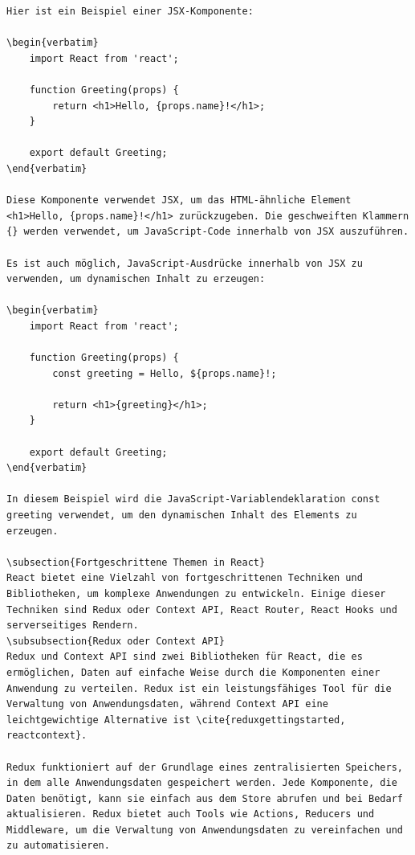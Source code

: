 \begin{lstlisting}
Hier ist ein Beispiel einer JSX-Komponente:

\begin{verbatim}
	import React from 'react';
	
	function Greeting(props) {
		return <h1>Hello, {props.name}!</h1>;
	}
	
	export default Greeting;
\end{verbatim}

Diese Komponente verwendet JSX, um das HTML-ähnliche Element <h1>Hello, {props.name}!</h1> zurückzugeben. Die geschweiften Klammern {} werden verwendet, um JavaScript-Code innerhalb von JSX auszuführen.

Es ist auch möglich, JavaScript-Ausdrücke innerhalb von JSX zu verwenden, um dynamischen Inhalt zu erzeugen:

\begin{verbatim}
	import React from 'react';
	
	function Greeting(props) {
		const greeting = Hello, ${props.name}!;
		
		return <h1>{greeting}</h1>;
	}
	
	export default Greeting;
\end{verbatim}

In diesem Beispiel wird die JavaScript-Variablendeklaration const greeting verwendet, um den dynamischen Inhalt des Elements zu erzeugen.

\subsection{Fortgeschrittene Themen in React}
React bietet eine Vielzahl von fortgeschrittenen Techniken und Bibliotheken, um komplexe Anwendungen zu entwickeln. Einige dieser Techniken sind Redux oder Context API, React Router, React Hooks und serverseitiges Rendern.
\subsubsection{Redux oder Context API}
Redux und Context API sind zwei Bibliotheken für React, die es ermöglichen, Daten auf einfache Weise durch die Komponenten einer Anwendung zu verteilen. Redux ist ein leistungsfähiges Tool für die Verwaltung von Anwendungsdaten, während Context API eine leichtgewichtige Alternative ist \cite{reduxgettingstarted, reactcontext}.

Redux funktioniert auf der Grundlage eines zentralisierten Speichers, in dem alle Anwendungsdaten gespeichert werden. Jede Komponente, die Daten benötigt, kann sie einfach aus dem Store abrufen und bei Bedarf aktualisieren. Redux bietet auch Tools wie Actions, Reducers und Middleware, um die Verwaltung von Anwendungsdaten zu vereinfachen und zu automatisieren.


\end{lstlisting}

